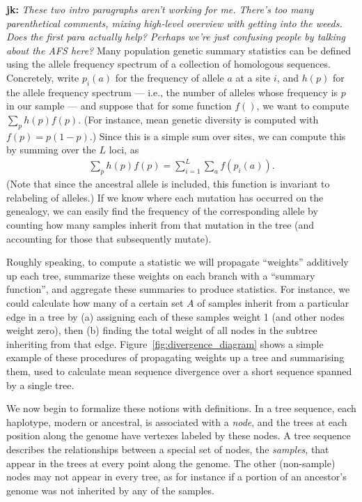 \documentclass{article}
\newcommand{\jk}[1]{{\color{red}\textbf{jk:} \it #1}}
\begin{document}
\jk{These two intro paragraphs aren't working for me. There's too many
parenthetical comments, mixing high-level overview with getting into
the weeds. Does the first para actually help? Perhaps we're just confusing
people by talking about the AFS here?}
Many population genetic summary statistics can be defined using the allele frequency spectrum
of a collection of homologous sequences.
Concretely, write $p_i(a)$ for the frequency of allele $a$ at a site $i$,
and $h(p)$ for the allele frequency spectrum
--- i.e., the number of alleles whose frequency is $p$ in our sample ---
and suppose that for some function $f()$, we want to compute $\sum_p h(p) f(p)$.
(For instance, mean genetic diversity is computed with $f(p) = p (1-p)$.)
Since this is a simple sum over sites,
we can compute this by summing over the $L$ loci, as
\begin{align*}
    \sum_p h(p) f(p) = \sum_{i=1}^L \sum_a f(p_i(a)).
\end{align*}
(Note that since the ancestral allele is included, this function is invariant to relabeling of alleles.)
If we know where each mutation has occurred on the genealogy,
we can easily find the frequency of the corresponding allele by counting how many samples
inherit from that mutation in the tree (and accounting for those that subsequently mutate).

Roughly speaking, to compute a statistic we will
propagate ``weights'' additively up each tree,
summarize these weights on each branch with a ``summary function'',
and aggregate these summaries to produce statistics.
For instance, we could calculate how many of a certain set $A$ of samples
inherit from a particular edge in a tree
by (a) assigning each of these samples weight 1 (and other nodes weight zero), then
(b) finding the total weight of all nodes in the subtree inheriting from that edge.
Figure~\ref{fig:divergence_diagram} shows a simple example of these procedures
of propagating weights up a tree and summarising them,
used to calculate mean sequence divergence over a short sequence spanned by a single tree.

We now begin to formalize these notions with definitions.
In a tree sequence, each haplotype, modern or ancestral, is associated with a \emph{node},
and the trees at each position along the genome have vertexes labeled by these nodes.
A tree sequence describes the relationships between a special set of nodes, the \emph{samples},
that appear in the trees at every point along the genome.
The other (non-sample) nodes may not appear in every tree,
as for instance if a portion of an ancestor's genome was not inherited by any of the samples.
\end{document}
